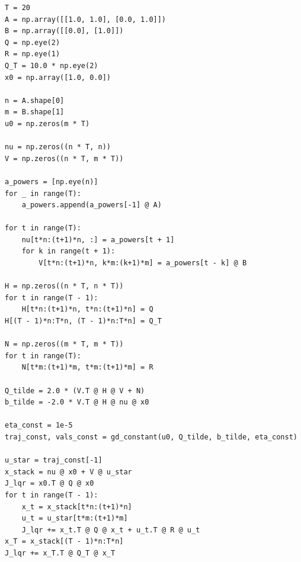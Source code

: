 \documentclass[11pt]{article}
\begin{document}
\begin{lstlisting}
T = 20
A = np.array([[1.0, 1.0], [0.0, 1.0]])
B = np.array([[0.0], [1.0]])
Q = np.eye(2)
R = np.eye(1)
Q_T = 10.0 * np.eye(2)
x0 = np.array([1.0, 0.0])

n = A.shape[0]
m = B.shape[1]
u0 = np.zeros(m * T)

nu = np.zeros((n * T, n))
V = np.zeros((n * T, m * T))

a_powers = [np.eye(n)]
for _ in range(T):
    a_powers.append(a_powers[-1] @ A)

for t in range(T):
    nu[t*n:(t+1)*n, :] = a_powers[t + 1]
    for k in range(t + 1):
        V[t*n:(t+1)*n, k*m:(k+1)*m] = a_powers[t - k] @ B

H = np.zeros((n * T, n * T))
for t in range(T - 1):
    H[t*n:(t+1)*n, t*n:(t+1)*n] = Q
H[(T - 1)*n:T*n, (T - 1)*n:T*n] = Q_T

N = np.zeros((m * T, m * T))
for t in range(T):
    N[t*m:(t+1)*m, t*m:(t+1)*m] = R

Q_tilde = 2.0 * (V.T @ H @ V + N)
b_tilde = -2.0 * V.T @ H @ nu @ x0

eta_const = 1e-5
traj_const, vals_const = gd_constant(u0, Q_tilde, b_tilde, eta_const)

u_star = traj_const[-1]
x_stack = nu @ x0 + V @ u_star
J_lqr = x0.T @ Q @ x0
for t in range(T - 1):
    x_t = x_stack[t*n:(t+1)*n]
    u_t = u_star[t*m:(t+1)*m]
    J_lqr += x_t.T @ Q @ x_t + u_t.T @ R @ u_t
x_T = x_stack[(T - 1)*n:T*n]
J_lqr += x_T.T @ Q_T @ x_T
\end{lstlisting}
\end{document}
